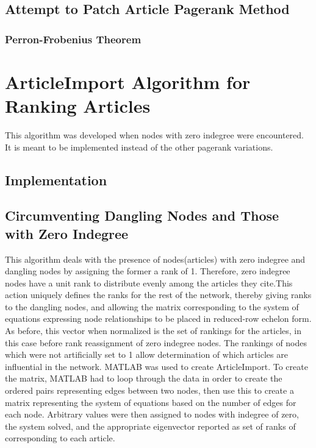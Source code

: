 \documentclass[14pt]{article} %
\begin{document}
  \subsection{Attempt to Patch Article Pagerank Method}
    \subsubsection{Perron-Frobenius Theorem}
\section{ArticleImport Algorithm for Ranking Articles}
    This algorithm was developed when nodes with zero indegree were encountered. It is meant to be implemented instead of the other pagerank variations. 
    \subsection{Implementation}
    \subsection{Circumventing Dangling Nodes and Those with Zero Indegree}
      This algorithm deals with the presence of nodes(articles) with zero indegree and dangling nodes by assigning the former a rank of 1. Therefore, zero indegree nodes have a unit rank to distribute evenly among the articles they cite.This action uniquely defines the ranks for the rest of the network, thereby giving ranks to the dangling nodes, and allowing the matrix corresponding to the system of equations expressing node relationships to be placed in reduced-row echelon form. As before, this vector when normalized is the set of rankings for the articles, in this case before rank reassignment of zero indegree nodes. The rankings of nodes which were not artificially set to 1 allow determination of which articles are influential in the network. MATLAB was used to create ArticleImport. To create the matrix, MATLAB had to loop through the data in order to create the ordered pairs representing edges between two nodes, then use this to create a matrix representing the system of equations based on the number of edges for each node. Arbitrary values were then assigned to nodes with indegree of zero, the system solved, and the appropriate eigenvector reported as set of ranks of corresponding to each article.
\end{document}
